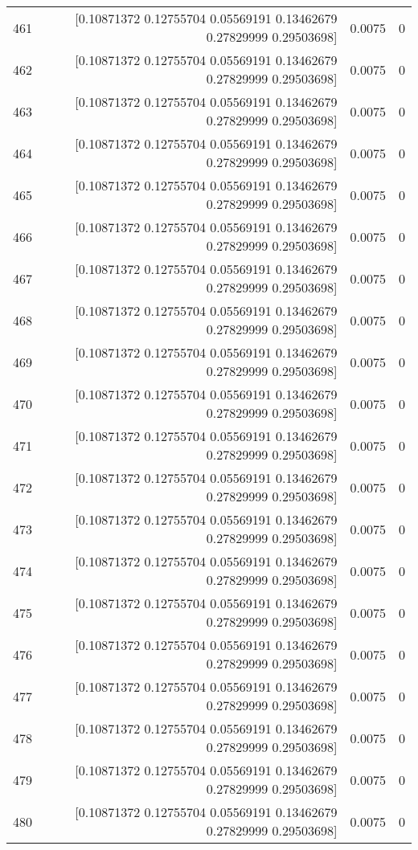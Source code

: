 \begin{longtable}{lrrr}
461 & [0.10871372 0.12755704 0.05569191 0.13462679 0.27829999 0.29503698] & 0.0075 & 0 \\
462 & [0.10871372 0.12755704 0.05569191 0.13462679 0.27829999 0.29503698] & 0.0075 & 0 \\
463 & [0.10871372 0.12755704 0.05569191 0.13462679 0.27829999 0.29503698] & 0.0075 & 0 \\
464 & [0.10871372 0.12755704 0.05569191 0.13462679 0.27829999 0.29503698] & 0.0075 & 0 \\
465 & [0.10871372 0.12755704 0.05569191 0.13462679 0.27829999 0.29503698] & 0.0075 & 0 \\
466 & [0.10871372 0.12755704 0.05569191 0.13462679 0.27829999 0.29503698] & 0.0075 & 0 \\
467 & [0.10871372 0.12755704 0.05569191 0.13462679 0.27829999 0.29503698] & 0.0075 & 0 \\
468 & [0.10871372 0.12755704 0.05569191 0.13462679 0.27829999 0.29503698] & 0.0075 & 0 \\
469 & [0.10871372 0.12755704 0.05569191 0.13462679 0.27829999 0.29503698] & 0.0075 & 0 \\
470 & [0.10871372 0.12755704 0.05569191 0.13462679 0.27829999 0.29503698] & 0.0075 & 0 \\
471 & [0.10871372 0.12755704 0.05569191 0.13462679 0.27829999 0.29503698] & 0.0075 & 0 \\
472 & [0.10871372 0.12755704 0.05569191 0.13462679 0.27829999 0.29503698] & 0.0075 & 0 \\
473 & [0.10871372 0.12755704 0.05569191 0.13462679 0.27829999 0.29503698] & 0.0075 & 0 \\
474 & [0.10871372 0.12755704 0.05569191 0.13462679 0.27829999 0.29503698] & 0.0075 & 0 \\
475 & [0.10871372 0.12755704 0.05569191 0.13462679 0.27829999 0.29503698] & 0.0075 & 0 \\
476 & [0.10871372 0.12755704 0.05569191 0.13462679 0.27829999 0.29503698] & 0.0075 & 0 \\
477 & [0.10871372 0.12755704 0.05569191 0.13462679 0.27829999 0.29503698] & 0.0075 & 0 \\
478 & [0.10871372 0.12755704 0.05569191 0.13462679 0.27829999 0.29503698] & 0.0075 & 0 \\
479 & [0.10871372 0.12755704 0.05569191 0.13462679 0.27829999 0.29503698] & 0.0075 & 0 \\
480 & [0.10871372 0.12755704 0.05569191 0.13462679 0.27829999 0.29503698] & 0.0075 & 0 \\

\end{longtable}
